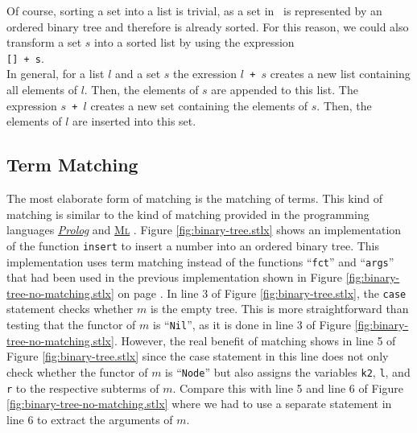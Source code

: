 Of course, sorting a set into a list is trivial, as a
set in \setlx\ is represented by an ordered binary tree and therefore is already sorted.
For this reason, we could also transform a set $s$ into a sorted list by using the expression
\\[0.2cm]
\hspace*{1.3cm}
\texttt{[] + s}.
\\[0.2cm]
In general, for a list $l$ and a set $s$ the exression \texttt{$l$ + $s$} creates a new
list containing all elements of $l$.  Then, the elements of $s$ are appended to this
list.  The expression \texttt{$s$ + $l$} creates a new set containing the elements of
$s$.  Then, the elements of $l$ are inserted into this set.


\subsection{Term Matching}
The most elaborate form of matching is the matching of terms.  This kind of matching is similar to
the kind of matching provided in the programming languages 
\href{http://en.wikipedia.org/wiki/Prolog}{\textsl{Prolog}} and 
\href{http://en.wikipedia.org/wiki/ML_(programming_language)}{\textsc{Ml}} \cite{milner:90}.
Figure \ref{fig:binary-tree.stlx} shows an implementation of the function \texttt{insert} to insert
a number into an ordered binary tree.  This implementation uses
term matching instead of the functions ``\texttt{fct}'' and ``\texttt{args}'' that had been used in
the previous implementation shown in Figure \ref{fig:binary-tree-no-matching.stlx} on page
\pageref{fig:binary-tree-no-matching.stlx}.  In line 3 of Figure \ref{fig:binary-tree.stlx}, the
\texttt{case} statement checks whether $m$ is the empty tree.  This is more straightforward than
testing that the functor of $m$ is ``\texttt{Nil}'', as it is done in line 3 of Figure
\ref{fig:binary-tree-no-matching.stlx}.  However, the real benefit of matching shows in line 5 of
Figure \ref{fig:binary-tree.stlx} since the case statement in this line does not only check whether
the functor of $m$ is ``\texttt{Node}'' but also assigns the variables \texttt{k2}, \texttt{l}, and
\texttt{r} to the respective subterms of $m$.  Compare this with line 5 and line 6 of Figure
\ref{fig:binary-tree-no-matching.stlx} where we had to use a separate statement in line 6 to extract
the arguments of $m$.


